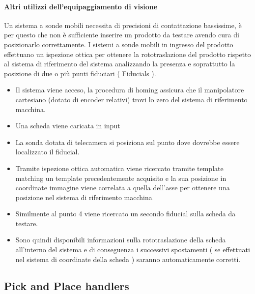 \paragraph{Altri utilizzi dell'equipaggiamento di visione}
Un sistema a sonde mobili necessita di precisioni di contattazione bassissime, è per questo che non è
sufficiente inserire un prodotto da testare avendo cura di posizionarlo correttamente.
I sistemi a sonde mobili in ingresso del prodotto effettuano un ispezione ottica per ottenere la
rototraslazione del prodotto rispetto al sistema di riferimento del sistema analizzando la presenza e
soprattutto la posizione di due o più punti fiduciari ( Fiducials ).

\begin{itemize}
\item Il sistema viene acceso, la procedura di homing assicura che il manipolatore cartesiano (dotato di
encoder relativi) trovi lo zero del sistema di riferimento macchina.
\item Una scheda viene caricata in input
\item La sonda dotata di telecamera si posiziona sul punto dove dovrebbe essere localizzato il fiducial.
\item Tramite ispezione ottica automatica viene ricercato tramite template matching un template
precedentemente acquisito e la sua posizione in coordinate immagine viene correlata a quella
dell’asse per ottenere una posizione nel sistema di riferimento macchina
\item Similmente al punto 4 viene ricercato un secondo fiducial sulla scheda da testare.
\item Sono quindi disponibili informazioni sulla rototraslazione della scheda all’interno del sistema e di
conseguenza i successivi spostamenti ( se effettuati nel sistema di coordinate della scheda )
saranno automaticamente corretti. 
\end{itemize}


\subsection{Pick and Place handlers}

